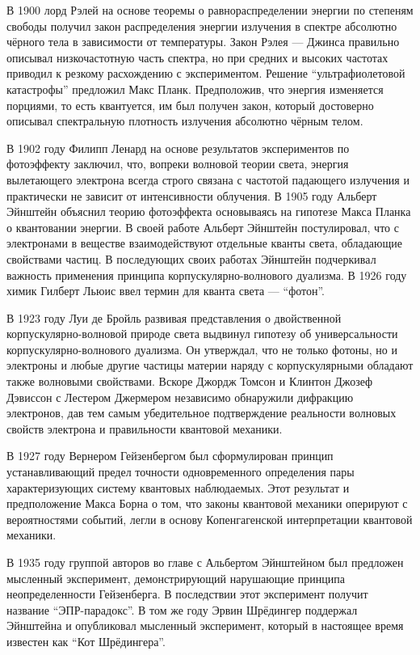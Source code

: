 В 1900 лорд Рэлей на основе теоремы о равнораспределении энергии по степеням свободы
получил закон распределения энергии излучения в спектре абсолютно чёрного тела в зависимости от температуры.
Закон Рэлея — Джинса правильно описывал низкочастотную часть спектра,
но при средних и высоких частотах приводил к резкому расхождению с экспериментом.
Решение ``ультрафиолетовой катастрофы'' предложил Макс Планк.
Предположив, что энергия изменяется порциями, то есть квантуется,
им был получен закон, который достоверно описывал спектральную плотность излучения абсолютно чёрным телом.

В 1902 году Филипп Ленард на основе результатов экспериментов по фотоэффекту заключил,
что, вопреки волновой теории света,
энергия вылетающего электрона всегда строго связана с частотой падающего излучения и практически не зависит от интенсивности облучения.
В 1905 году Альберт Эйнштейн объяснил теорию фотоэффекта основываясь на гипотезе Макса Планка о квантовании энергии.
В своей работе Альберт Эйнштейн постулировал,
что с электронами в веществе взаимодействуют отдельные кванты света,
обладающие свойствами частиц.
В последующих своих работах Эйнштейн подчеркивал важность применения принципа корпускулярно-волнового дуализма.
В 1926 году химик Гилберт Льюис ввел термин для кванта света --- ``фотон''.

В 1923 году Луи де Бройль развивая представления о двойственной корпускулярно-волновой природе света
выдвинул гипотезу об универсальности корпускулярно-волнового дуализма.
Он утверждал, что не только фотоны, но и электроны и любые другие частицы материи наряду с корпускулярными обладают также волновыми свойствами.
Вскоре Джордж Томсон и Клинтон Джозеф Дэвиссон с Лестером Джермером независимо обнаружили дифракцию электронов, дав тем самым убедительное подтверждение реальности волновых свойств электрона и правильности квантовой механики.

В 1927 году Вернером Гейзенбергом был сформулирован принцип устанавливающий предел точности одновременного определения пары характеризующих систему квантовых наблюдаемых. Этот результат и предположение Макса Борна о том,
что законы квантовой механики оперируют с вероятностями событий,
легли в основу Копенгагенской интерпретации квантовой механики.

В 1935 году группой авторов во главе с Альбертом Эйнштейном был предложен мысленный эксперимент,
демонстрирующий нарушающие принципа неопределенности Гейзенберга.
В последствии этот эксперимент получит название ``ЭПР-парадокс''.
В том же году Эрвин Шрёдингер поддержал Эйнштейна
и опубликовал мысленный эксперимент,
который в настоящее время известен как ``Кот Шрёдингера''.

